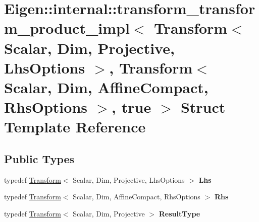 \hypertarget{struct_eigen_1_1internal_1_1transform__transform__product__impl_3_01_transform_3_01_scalar_00_01b95bea6ac8fd6454e5f4295a3f69392b}{}\section{Eigen\+::internal\+::transform\+\_\+transform\+\_\+product\+\_\+impl$<$ Transform$<$ Scalar, Dim, Projective, Lhs\+Options $>$, Transform$<$ Scalar, Dim, Affine\+Compact, Rhs\+Options $>$, true $>$ Struct Template Reference}
\label{struct_eigen_1_1internal_1_1transform__transform__product__impl_3_01_transform_3_01_scalar_00_01b95bea6ac8fd6454e5f4295a3f69392b}
\subsection*{Public Types}
\begin{DoxyCompactItemize}
\item 
\mbox{\label{struct_eigen_1_1internal_1_1transform__transform__product__impl_3_01_transform_3_01_scalar_00_01b95bea6ac8fd6454e5f4295a3f69392b_a8fb1c3971ba72b2d1f66c49515ff6965}} 
typedef \mbox{\hyperlink{class_eigen_1_1_transform}{Transform}}$<$ Scalar, Dim, Projective, Lhs\+Options $>$ {\bfseries Lhs}
\item 
\mbox{\label{struct_eigen_1_1internal_1_1transform__transform__product__impl_3_01_transform_3_01_scalar_00_01b95bea6ac8fd6454e5f4295a3f69392b_a7ba033bc06359f84ec25df9d16d96bdc}} 
typedef \mbox{\hyperlink{class_eigen_1_1_transform}{Transform}}$<$ Scalar, Dim, Affine\+Compact, Rhs\+Options $>$ {\bfseries Rhs}
\item 
\mbox{\label{struct_eigen_1_1internal_1_1transform__transform__product__impl_3_01_transform_3_01_scalar_00_01b95bea6ac8fd6454e5f4295a3f69392b_a7609b78c5692e6d4658dda6991966f62}} 
typedef \mbox{\hyperlink{class_eigen_1_1_transform}{Transform}}$<$ Scalar, Dim, Projective $>$ {\bfseries Result\+Type}
\end{DoxyCompactItemize}
